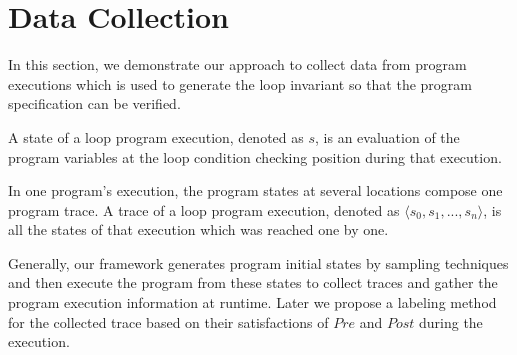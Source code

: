 
\section{Data Collection} %
\label{sec:sampling}

In this section, we demonstrate our approach to collect data from program executions 
which is used to generate the loop invariant so that the program specification can be verified.

\begin{definition}[State]
A state of a loop program execution, denoted as $s$, is an evaluation of the program variables at the loop condition checking position during that execution.
\end{definition} 
\begin{definition}[Trace]
In one program's execution, the program states at several locations compose one program trace.
A trace of a loop program execution, denoted as $\langle s_0, s_1, ..., s_n\rangle$, is all the states of that execution which was reached one by one. 
\end{definition}

Generally, our framework generates program initial states by sampling techniques and 
then execute the program from these states to collect traces and gather the program execution information at runtime.
Later we propose a labeling method for the collected trace
based on their satisfactions of $\mathit{Pre}$ and $\mathit{Post}$ during the execution. 

